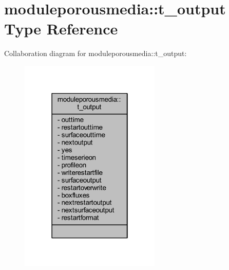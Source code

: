 \hypertarget{structmoduleporousmedia_1_1t__output}{}\section{moduleporousmedia\+:\+:t\+\_\+output Type Reference}
\label{structmoduleporousmedia_1_1t__output}


Collaboration diagram for moduleporousmedia\+:\+:t\+\_\+output\+:\nopagebreak
\begin{figure}[H]
\begin{center}
\leavevmode
\includegraphics[width=190pt]{structmoduleporousmedia_1_1t__output__coll__graph}
\end{center}
\end{figure}
